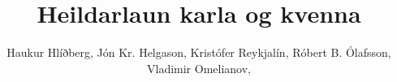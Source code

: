 
\renewcommand{\d}[1]{\;\textsf{d}#1}
\newcommand{\pd}[1]{\partial #1}
\newcommand{\D}{\;\textsf{D}}
\providecommand{\e}[1]{\ensuremath{\times 10^{#1}}}
\newcommand{\kg}[1]{\SI{#1}{\kilo\gram}}
\newcommand{\mA}[1]{\SI{#1}{\milli\ampere}}
\newcommand{\amp}[1]{SI{#1}{\ampere\xspace}}


\newcommand{\realset}{\ensuremath{\mathbb{R}}}
\newcommand{\intset}{\ensuremath{\mathbb{Z}}}
\newcommand{\ratset}{\ensuremath{\mathbb{Q}}}


\newcommand{\adfr}{\ensuremath{\text{FR}}}
\newcommand{\addp}{\ensuremath{\text{DP}}}
\newcommand{\adpv}{\ensuremath{\text{PV}}}

\newcommand{\cfigure}[2]{\begin{figure}[h]
\centering %
\texttt{[image: \#1]}%
\caption{#2\label{fig:#1}}%
\end{figure}%
}
\newcommand{\cfiguresize}[3]{\begin{figure}[h]
\centering %
\texttt{[image: \#1]}%
\caption{#2\label{fig:#1}}%
\end{figure}%
}

\author{Haukur Hlíðberg, Jón Kr. Helgason, Kristófer Reykjalín, Róbert B. Ólafsson, Vladimir Omelianov,}  %
\title{Heildarlaun karla og kvenna}  %
\graphicspath{{graphics/}{Graphics/}{./}}

\usepackage[backend=biber, bibencoding=utf8, style=ieee]{biblatex}


\usepackage{caption}
\captionsetup[figure]{name=Mynd}

\usepackage[final,hidelinks]{hyperref} %
